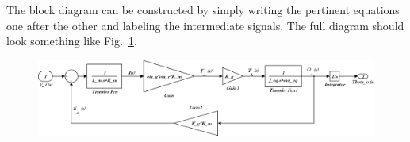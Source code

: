 \begin{Solution}{1}
        The block diagram can be constructed by simply writing the pertinent equations one after the other and labeling the intermediate signals.  The full diagram should look something like Fig.\ \ref{fig.sol.poscon.blockdiagram}.
        \begin{figure}
        \centering
        \includegraphics[angle=90, height=.95\textheight]{posconprelab1}
        \caption{\label{fig.sol.poscon.blockdiagram}}
        \end{figure}
        
\end{Solution}

